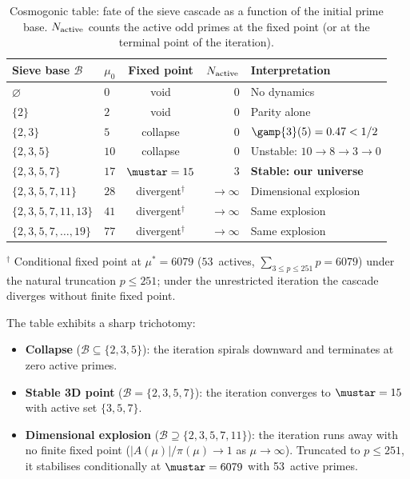 \documentclass[12pt,a4paper]{article}
\begin{document}
\begin{table}[htbp]
\centering
\caption{Cosmogonic table: fate of the sieve cascade as a function
  of the initial prime base.  $N_{\rm active}$ counts the active odd
  primes at the fixed point (or at the terminal point of the
  iteration).}
\label{tab:cosmogonic}
\begin{tabular}{llcrl}
\toprule
Sieve base $\mathcal{B}$ & $\mu_0$ & Fixed point & $N_{\rm active}$ & Interpretation \\
\midrule
$\varnothing$           & $0$  & void        & 0  & No dynamics \\
$\{2\}$                 & $2$  & void        & 0  & Parity alone \\
$\{2,3\}$               & $5$  & collapse    & 0  & $\gamp{3}(5) = 0.47 < 1/2$ \\
$\{2,3,5\}$             & $10$ & collapse    & 0  & Unstable: $10 \to 8 \to 3 \to 0$ \\
$\{2,3,5,7\}$           & $17$ & $\mustar = 15$ & 3  & \textbf{Stable: our universe} \\
$\{2,3,5,7,11\}$        & $28$ & divergent$^\dagger$ & $\to\infty$ & Dimensional explosion \\
$\{2,3,5,7,11,13\}$     & $41$ & divergent$^\dagger$ & $\to\infty$ & Same explosion \\
$\{2,3,5,7,\ldots,19\}$ & $77$ & divergent$^\dagger$ & $\to\infty$ & Same explosion \\
\bottomrule
\end{tabular}
\smallskip
\par\noindent\footnotesize
$^\dagger$ Conditional fixed point at $\mu^* = 6079$ ($53$~actives,
$\sum_{3\leq p \leq 251} p = 6079$) under the natural truncation
$p \leq 251$; under the unrestricted iteration the cascade
diverges without finite fixed point.
\end{table}

The table exhibits a sharp trichotomy:
\begin{itemize}[nosep]
\item \textbf{Collapse} ($\mathcal{B} \subseteq \{2,3,5\}$): the
  iteration spirals downward and terminates at zero active primes.
\item \textbf{Stable 3D point} ($\mathcal{B} = \{2,3,5,7\}$): the
  iteration converges to $\mustar = 15$ with active set $\{3,5,7\}$.
\item \textbf{Dimensional explosion} ($\mathcal{B} \supseteq
  \{2,3,5,7,11\}$): the iteration runs away with no finite fixed
  point ($|A(\mu)|/\pi(\mu) \to 1$ as $\mu \to \infty$).  Truncated
  to $p \leq 251$, it stabilises conditionally at
  $\mustar = 6079$ with 53~active primes.
\end{itemize}
\end{document}
